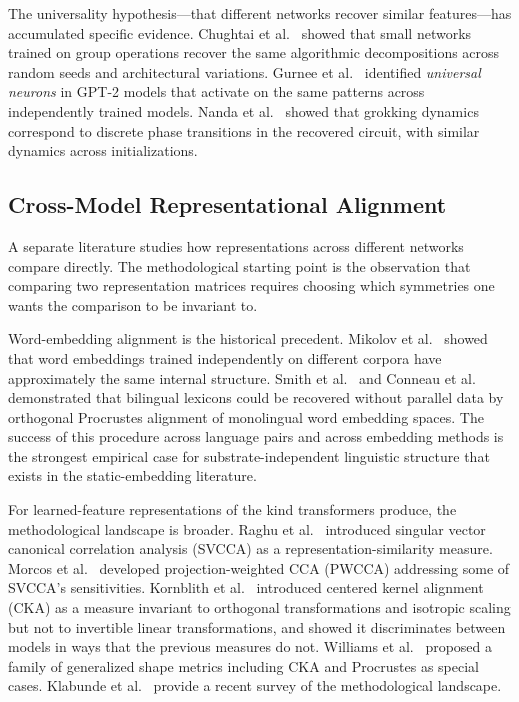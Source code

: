The universality hypothesis---that different networks recover similar
features---has accumulated specific evidence. Chughtai et
al.~\cite{chughtai2023toy} showed that small networks trained on group
operations recover the same algorithmic decompositions across random
seeds and architectural variations. Gurnee et al.~\cite{gurnee2024universal}
identified \emph{universal neurons} in GPT-2 models that activate on the
same patterns across independently trained models. Nanda et
al.~\cite{nanda2023progress} showed that grokking dynamics correspond
to discrete phase transitions in the recovered circuit, with similar
dynamics across initializations.

\subsection{Cross-Model Representational Alignment}

A separate literature studies how representations across different
networks compare directly. The methodological starting point is the
observation that comparing two representation matrices requires
choosing which symmetries one wants the comparison to be invariant to.

Word-embedding alignment is the historical precedent. Mikolov et
al.~\cite{mikolov2013distributed} showed that word embeddings trained
independently on different corpora have approximately the same internal
structure. Smith et al.~\cite{smith2017offline} and Conneau et
al.~\cite{conneau2017word} demonstrated that bilingual lexicons could
be recovered without parallel data by orthogonal Procrustes alignment
of monolingual word embedding spaces. The success of this procedure
across language pairs and across embedding methods is the strongest
empirical case for substrate-independent linguistic structure that
exists in the static-embedding literature.

For learned-feature representations of the kind transformers produce,
the methodological landscape is broader. Raghu et al.~\cite{raghu2017svcca}
introduced singular vector canonical correlation analysis (SVCCA) as a
representation-similarity measure. Morcos et al.~\cite{morcos2018insights}
developed projection-weighted CCA (PWCCA) addressing some of SVCCA's
sensitivities. Kornblith et al.~\cite{kornblith2019similarity}
introduced centered kernel alignment (CKA) as a measure invariant to
orthogonal transformations and isotropic scaling but not to invertible
linear transformations, and showed it discriminates between models in
ways that the previous measures do not. Williams et
al.~\cite{williams2021generalized} proposed a family of generalized
shape metrics including CKA and Procrustes as special cases. Klabunde
et al.~\cite{klabunde2024similarity} provide a recent survey of the
methodological landscape.

